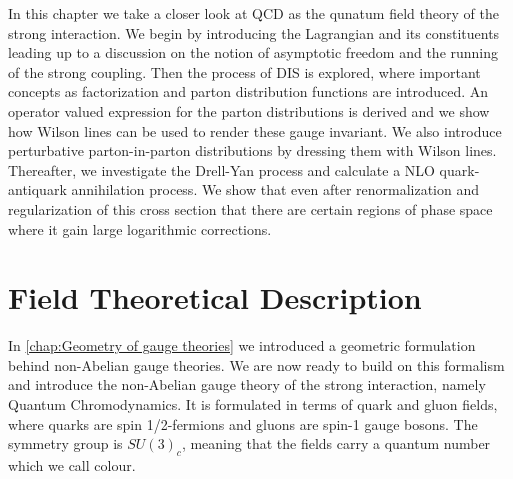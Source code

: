 In this chapter we take a closer look at QCD as the qunatum field theory of the strong interaction. We begin by introducing the Lagrangian and its constituents leading up to a discussion on the notion of asymptotic freedom and the running of the strong coupling. Then the process of DIS is explored, where important concepts as factorization and parton distribution functions are introduced. An operator valued expression for the parton distributions is derived and we show how Wilson lines can be used to render these gauge invariant. We also introduce perturbative parton-in-parton distributions by dressing them with Wilson lines. Thereafter, we investigate the Drell-Yan process and calculate a NLO quark-antiquark annihilation process. We show that even after renormalization and regularization of this cross section that there are certain regions of phase space where it gain large logarithmic corrections.

\section{Field Theoretical Description}
In \cref{chap:Geometry of gauge theories} we introduced a geometric formulation behind non-Abelian gauge theories. We are now ready to build on this formalism and introduce the non-Abelian gauge theory of the strong interaction, namely Quantum Chromodynamics. It is formulated in terms of quark and gluon fields, where quarks are spin 1/2-fermions and gluons are spin-1 gauge bosons. The symmetry group is $SU(3)_{c}$, meaning that the fields carry a quantum number which we call colour. 

